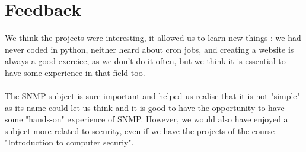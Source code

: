 \documentclass[a4paper,titlepage]{article}
\begin{document}
\section{Feedback} 
We think the projects were interesting, it allowed us to learn new things : we had never coded in python, neither heard about cron jobs, and creating a website is always a good exercice, as we don't do it often, but we think it is essential to have some experience in that field too.

\paragraph{}

The SNMP subject is sure important and helped us realise that it is not "simple" as its name could let us think and it is good to have the opportunity to have some "hands-on" experience of SNMP. However, we would also have enjoyed a subject more related to security, even if we have the projects of the course "Introduction to computer securiy".
\end{document}
